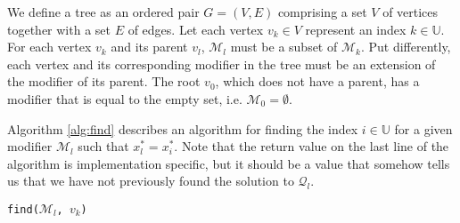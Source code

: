 

We define a tree as an ordered pair $G = (V,E)$ comprising a set $V$ of
vertices together with a set $E$ of edges.
Let each vertex $v_k \in V$ represent an index $k \in \mathbb{U}$.
For each vertex $v_k$ and its parent $v_l$, $\mathcal{M}_l$ must
be a subset of $\mathcal{M}_k$.
Put differently, each vertex and its corresponding modifier in the tree must be
an extension of the modifier of its parent.
The root $v_0$, which does not have a parent, has a modifier that is equal
to the empty set, i.e. $\mathcal{M}_0 = \emptyset$.

Algorithm \ref{alg:find} describes an algorithm for finding the index
$i \in \mathbb{U}$ for a given modifier $\mathcal{M}_l$ such that
$x_l^* = x_i^*$.
Note that the return value
on the last line of the algorithm is implementation specific, but it should be
a value that somehow tells us that we have not previously found the solution to
$\mathcal{Q}_l$.

\begin{algorithm}[ht!]
\caption{\texttt{find($\mathcal{M}_l$, $v_k$)}}
\label{alg:find}

\end{algorithm}

